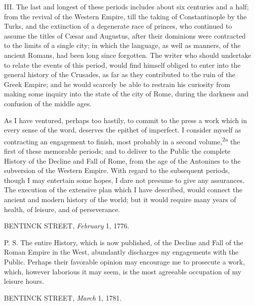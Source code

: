 III. The last and longest of these periods includes about six centuries and
a half; from the revival of the Western Empire, till the taking of Constantinople
by the Turks, and the extinction of a degenerate race of princes, who continued
to assume the titles of Cæsar and Augustus, after their dominions were contracted
to the limits of a single city; in which the language, as well as manners,
of the ancient Romans, had been long since forgotten. The writer who should
undertake to relate the events of this period, would find himself obliged to
enter into the general history of the Crusades, as far as they contributed to
the ruin of the Greek Empire; and he would scarcely be able to restrain his
curiosity from making some inquiry into the state of the city of Rome, during
the darkness and confusion of the middle ages.

As I have ventured, perhaps too hastily, to commit to the press a work which
in every sense of the word, deserves the epithet of imperfect. I consider
myself as contracting an engagement to finish, most probably in a second
volume,\textsuperscript{2a} the first of these memorable periods; and to deliver
to the Public the complete History of the Decline and Fall of Rome, from the
age of the Antonines to the subversion of the Western Empire. With regard to
the subsequent periods, though I may entertain some hopes, I dare not presume
to give any assurances. The execution of the extensive plan which I have
described, would connect the ancient and modern history of the world; but it
would require many years of health, of leisure, and of perseverance.


BENTINCK STREET, \textit{February} 1, 1776.

P. S. The entire History, which is now published, of the Decline and Fall of
the Roman Empire in the West, abundantly discharges my engagements with the
Public. Perhaps their favorable opinion may encourage me to prosecute a work,
which, however laborious it may seem, is the most agreeable occupation of my
leisure hours.

BENTINCK STREET, \textit{March} 1, 1781.

